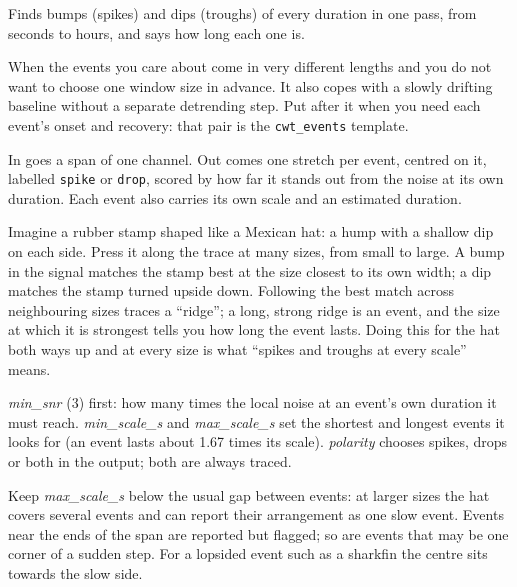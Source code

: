 Finds bumps (spikes) and dips (troughs) of every duration in one pass, from seconds to hours,
and says how long each one is.

When the events you care about come in very different lengths and you do not want to choose one
window size in advance. It also copes with a slowly drifting baseline without a separate
detrending step. Put  after it when you need each event's
onset and recovery: that pair is the \texttt{cwt\_events} template.

In goes a span of one channel. Out comes one stretch per event, centred on it, labelled
\texttt{spike} or \texttt{drop}, scored by how far it stands out from the noise at its own
duration. Each event also carries its own scale and an estimated duration.

\begin{plainterms}
Imagine a rubber stamp shaped like a Mexican hat: a hump with a shallow dip on each side.
Press it along the trace at many sizes, from small to large. A bump in the signal matches the
stamp best at the size closest to its own width; a dip matches the stamp turned upside down.
Following the best match across neighbouring sizes traces a ``ridge''; a long, strong ridge is an
event, and the size at which it is strongest tells you how long the event lasts. Doing this for
the hat both ways up and at every size is what ``spikes and troughs at every scale'' means.
\end{plainterms}

\emph{min\_snr} (3) first: how many times the local noise at an event's own duration it must
reach. \emph{min\_scale\_s} and \emph{max\_scale\_s} set the shortest and longest events it
looks for (an event lasts about 1.67 times its scale). \emph{polarity} chooses spikes, drops or
both in the output; both are always traced.

Keep \emph{max\_scale\_s} below the usual gap between events: at larger sizes the hat covers
several events and can report their arrangement as one slow event. Events near the ends of the
span are reported but flagged; so are events that may be one corner of a sudden step. For a
lopsided event such as a sharkfin the centre sits towards the slow side.
